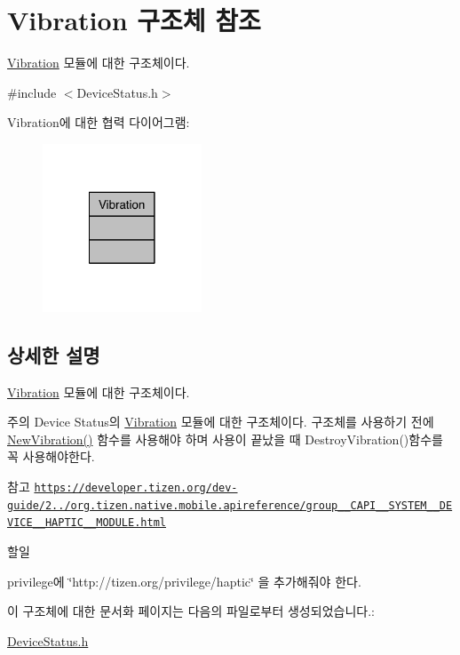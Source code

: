 \hypertarget{struct_vibration}{\section{Vibration 구조체 참조}
\label{struct_vibration}
}


\hyperlink{struct_vibration}{Vibration} 모듈에 대한 구조체이다.  




{\ttfamily \#include $<$Device\-Status.\-h$>$}



Vibration에 대한 협력 다이어그램\-:\nopagebreak
\begin{figure}[H]
\begin{center}
\leavevmode
\includegraphics[width=134pt]{struct_vibration__coll__graph}
\end{center}
\end{figure}


\subsection{상세한 설명}
\hyperlink{struct_vibration}{Vibration} 모듈에 대한 구조체이다. 

\begin{DoxyNote}{주의}
Device Status의 \hyperlink{struct_vibration}{Vibration} 모듈에 대한 구조체이다. 구조체를 사용하기 전에 \hyperlink{_device_status_8h_a0ec310def9439efd69610eadcd0e9678}{New\-Vibration()} 함수를 사용해야 하며 사용이 끝났을 때 Destroy\-Vibration()함수를 꼭 사용해야한다. 
\end{DoxyNote}
\begin{DoxySeeAlso}{참고}
\href{https://developer.tizen.org/dev-guide/2.3.0/org.tizen.native.mobile.apireference/group__CAPI__SYSTEM__DEVICE__HAPTIC__MODULE.html}{\tt https\-://developer.\-tizen.\-org/dev-\/guide/2../org.\-tizen.\-native.\-mobile.\-apireference/group\-\_\-\-\_\-\-C\-A\-P\-I\-\_\-\-\_\-\-S\-Y\-S\-T\-E\-M\-\_\-\-\_\-\-D\-E\-V\-I\-C\-E\-\_\-\-\_\-\-H\-A\-P\-T\-I\-C\-\_\-\-\_\-\-M\-O\-D\-U\-L\-E.\-html} 
\end{DoxySeeAlso}
\begin{DoxyRefDesc}{할일}
\item[\hyperlink{todo__todo000003}{할일}]privilege에 \char`\"{}http\-://tizen.\-org/privilege/haptic\char`\"{} 을 추가해줘야 한다. \end{DoxyRefDesc}


이 구조체에 대한 문서화 페이지는 다음의 파일로부터 생성되었습니다.\-:\begin{DoxyCompactItemize}
\item 
\hyperlink{_device_status_8h}{Device\-Status.\-h}\end{DoxyCompactItemize}
